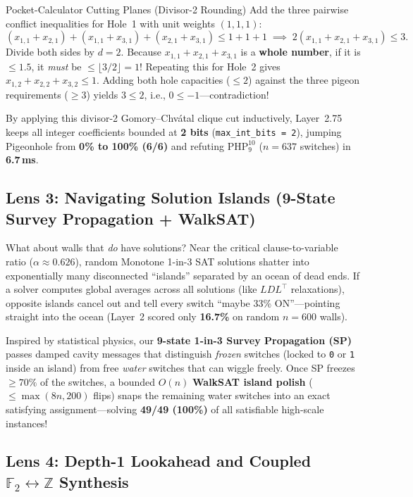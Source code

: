 \documentclass[11pt]{article}
\begin{document}
\begin{intuition}{Pocket-Calculator Cutting Planes (Divisor-2 Rounding)}
Add the three pairwise conflict inequalities for Hole~1 with unit weights $(1, 1, 1)$:
\[
(x_{1,1} + x_{2,1}) + (x_{1,1} + x_{3,1}) + (x_{2,1} + x_{3,1}) \le 1 + 1 + 1
\;\implies\; 2(x_{1,1} + x_{2,1} + x_{3,1}) \le 3.
\]
Divide both sides by $d = 2$. Because $x_{1,1} + x_{2,1} + x_{3,1}$ is a \textbf{whole number}, if it is $\le 1.5$, it \emph{must} be $\le \lfloor 3/2 \rfloor = 1$! Repeating this for Hole~2 gives $x_{1,2} + x_{2,2} + x_{3,2} \le 1$. Adding both hole capacities ($\le 2$) against the three pigeon requirements ($\ge 3$) yields $3 \le 2$, i.e., \textbf{$0 \le -1$}---contradiction!
\end{intuition}

By applying this divisor-2 Gomory--Chv\'atal clique cut inductively, Layer~2.75 keeps all integer coefficients bounded at \textbf{2 bits} (\texttt{max\_int\_bits = 2}), jumping Pigeonhole from \textbf{0\% to 100\% (6/6)} and refuting $\mathrm{PHP}_9^{10}$ ($n = 637$ switches) in \textbf{6.7\,ms}.

\subsection{Lens 3: Navigating Solution Islands (9-State Survey Propagation + WalkSAT)}

What about walls that \emph{do} have solutions? Near the critical clause-to-variable ratio ($\alpha \approx 0.626$), random Monotone 1-in-3 SAT solutions shatter into exponentially many disconnected ``islands'' separated by an ocean of dead ends. If a solver computes global averages across all solutions (like $LDL^\top$ relaxations), opposite islands cancel out and tell every switch ``maybe 33\% ON''---pointing straight into the ocean (Layer~2 scored only \textbf{16.7\%} on random $n = 600$ walls).

Inspired by statistical physics, our \textbf{9-state 1-in-3 Survey Propagation (SP)} passes damped cavity messages that distinguish \emph{frozen} switches (locked to \texttt{0} or \texttt{1} inside an island) from free \emph{water} switches that can wiggle freely. Once SP freezes $\ge 70\%$ of the switches, a bounded $O(n)$ \textbf{WalkSAT island polish} ($\le \max(8n, 200)$ flips) snaps the remaining water switches into an exact satisfying assignment---solving \textbf{49/49 (100\%)} of all satisfiable high-scale instances!

\subsection{Lens 4: Depth-1 Lookahead and Coupled $\mathbb{F}_2 \leftrightarrow \mathbb{Z}$ Synthesis}
\end{document}
